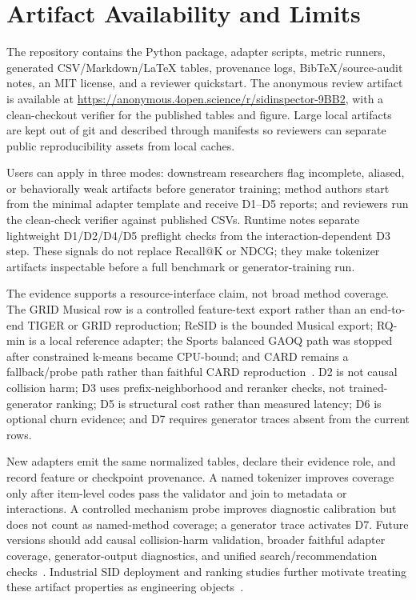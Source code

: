 \section{Artifact Availability and Limits}

The repository contains the \tool Python package, adapter scripts, metric
runners, generated CSV/Markdown/\LaTeX{} tables, provenance logs,
BibTeX/source-audit notes, an MIT license, and a reviewer quickstart. The
anonymous review artifact is available at
\url{https://anonymous.4open.science/r/sidinspector-9BB2}, with a clean-checkout
verifier for the published tables and figure. Large local artifacts are kept
out of git and described through manifests so reviewers can separate public
reproducibility assets from local caches.

Users can apply \tool in three modes: downstream researchers flag incomplete,
aliased, or behaviorally weak artifacts before generator training; method
authors start from the minimal adapter template and receive D1--D5 reports; and
reviewers run the clean-check verifier against published CSVs. Runtime notes
separate lightweight D1/D2/D4/D5 preflight checks from the interaction-dependent
D3 step. These signals do not replace Recall@K or NDCG; they make tokenizer
artifacts inspectable before a full benchmark or generator-training run.

The evidence supports a resource-interface claim, not broad method coverage.
The GRID Musical row is a controlled feature-text export rather than an
end-to-end TIGER or GRID reproduction; ReSID is the bounded Musical export;
RQ-min is a local reference adapter; the Sports balanced GAOQ path was stopped
after constrained k-means became CPU-bound; and CARD remains a fallback/probe
path rather than faithful CARD reproduction~\cite{wei2026card}. D2 is not
causal collision harm; D3 uses prefix-neighborhood and reranker checks, not
trained-generator ranking; D5 is structural cost rather than measured latency;
D6 is optional churn evidence; and D7 requires generator traces absent from the
current rows.

New adapters emit the same normalized tables, declare their evidence role, and
record feature or checkpoint provenance. A named tokenizer improves coverage
only after item-level codes pass the validator and join to metadata or
interactions. A controlled mechanism probe improves diagnostic calibration but
does not count as named-method coverage; a generator trace activates D7.
Future versions should add causal collision-harm validation, broader faithful
adapter coverage, generator-output diagnostics, and unified search/recommendation
checks~\cite{li2024survey,penha2025jointsid}. Industrial SID deployment and
ranking studies further motivate treating these artifact properties as
engineering objects~\cite{singh2023bettersemanticids,li2026sidcoord,ju2026snapchatsid,xu2026largescalegenrec}.

